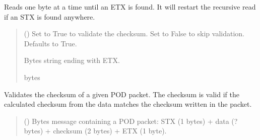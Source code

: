 \documentclass[letterpaper,10pt,english]{sphinxmanual}
\begin{document}
\begin{fulllineitems}
\begin{fulllineitems}
\label{\detokenize{BasicPodProtocol:BasicPodProtocol.POD_Basics._Read_ToETX}}
\pysigstartsignatures
{}
\pysigstopsignatures
\sphinxAtStartPar
Reads one byte at a time until an ETX is found. It will restart the recursive read if an STX         is found anywhere.
\begin{quote}\begin{description}
\sphinxAtStartPar
{} (\sphinxstyleliteralemphasis{\sphinxupquote{, }}) \textendash{} Set to True to validate the checksum. Set to False to skip                 validation. Defaults to True.

\sphinxAtStartPar
Bytes string ending with ETX.

\sphinxAtStartPar
bytes

\end{description}\end{quote}

\end{fulllineitems}


\begin{fulllineitems}
\label{\detokenize{BasicPodProtocol:BasicPodProtocol.POD_Basics._ValidateChecksum}}
\pysigstartsignatures
{}
\pysigstopsignatures
\sphinxAtStartPar
Validates the checksum of a given POD packet. The checksum is valid if the calculated checksum
from the data matches the checksum written in the packet.
\begin{quote}\begin{description}
\sphinxAtStartPar
{} () \textendash{} Bytes message containing a POD packet: STX (1 bytes) + data (? bytes) + checksum                 (2 bytes) + ETX (1 byte).


\end{description}
\end{quote}
\end{fulllineitems}
\end{fulllineitems}
\end{document}
